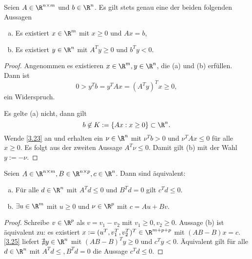 \begin{lem} \label{3.25}
	Seien $A \in \R^{n\times m}$ und $b \in \R^n$.
	Es gilt stets genau eine der beiden folgenden Aussagen
	\begin{enumerate}[(a)]
		\item
			Es existiert $x \in \R^m$ mit $x \ge 0$ und $Ax = b$,
		\item
			Es existiert $y \in \R^n$ mit $A^T y \ge 0$ und $b^T y < 0$.
	\end{enumerate}
	\begin{proof}
		Angenommen es existieren $x \in \R^m, y \in \R^n$, die (a) und (b) erfüllen.
		Dann ist
		\[
			0
			> y^T b
			= y^T Ax
			= (A^T y)^T x
			\ge 0,
		\]
		ein Widerspruch.

		Es gelte (a) nicht, dann gilt
		\[
			b \not\in K := \{ Ax : x \ge 0 \} \subset \R^n.
		\]
		Wende \ref{3.23} an und erhalten ein $\nu \in \R^n$ mit $\nu^T b > 0$ und $\nu^T Ax \le 0$ für alle $x \ge 0$.
		Es folgt aus der zweiten Aussage $A^T \nu \le 0$.
		Damit gilt (b) mit der Wahl $y := -\nu$.
	\end{proof}
\end{lem}

\begin{kor} \label{3.26}
	Seien $A \in \R^{n\times m}, B \in \R^{n\times p}, c \in \R^n$.
	Dann sind äquivalent:
	\begin{enumerate}[(a)]
		\item
			Für alle $d \in \R^n$ mit $A^T d \le 0$ und $B^T d = 0$ gilt $c^T d \le 0$.
		\item
			$\exists u \in \R^m$ mit $u \ge 0$ und $\nu \in \R^p$ mit $c = Au + Bv$.
	\end{enumerate}
	\begin{proof}
		Schreibe $v \in \R^p$ als $v = v_1 - v_2$ mit $v_1 \ge 0, v_2 \ge 0$.
		Aussage (b) ist äquivalent zu: es existiert $x := (u^T, v_1^T, v_2^T)^T \in \R^{m+p+p}$ mit $(A B -B) x = c$.
		\ref{3.25} liefert $\nexists y \in \R^n$ mit $(A B -B)^T y \ge 0$ und $c^T y < 0$.
		Äquivalent gilt für alle $d \in \R^n$ mit $A^T d \le , B^T d = 0$ die Aussage $c^T d \le 0$.
	\end{proof}
\end{kor}

